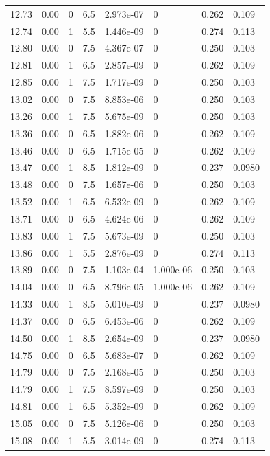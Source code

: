\documentclass[preview]{standalone}
\begin{document}
{{{{\begin{tabular}{L{1.2cm}C{1.2cm} C{0.3cm}C{0.5cm} C{1.4cm}C{1.4cm} C{1.4cm}C{1.4cm}}
  12.73  &  0.00  & 0     & 6.5 &  2.973e-07  & 0  & 0.262 &  0.109   \\ 
  12.74  &  0.00  & 1     & 5.5 &  1.446e-09  & 0  & 0.274 &  0.113   \\ 
  12.80  &  0.00  & 0     & 7.5 &  4.367e-07  & 0  & 0.250 &  0.103   \\ 
  12.81  &  0.00  & 1     & 6.5 &  2.857e-09  & 0  & 0.262 &  0.109   \\ 
  12.85  &  0.00  & 1     & 7.5 &  1.717e-09  & 0  & 0.250 &  0.103   \\ 
  13.02  &  0.00  & 0     & 7.5 &  8.853e-06  & 0  & 0.250 &  0.103   \\ 
  13.26  &  0.00  & 1     & 7.5 &  5.675e-09  & 0  & 0.250 &  0.103   \\ 
  13.36  &  0.00  & 0     & 6.5 &  1.882e-06  & 0  & 0.262 &  0.109   \\ 
  13.46  &  0.00  & 0     & 6.5 &  1.715e-05  & 0  & 0.262 &  0.109   \\ 
  13.47  &  0.00  & 1     & 8.5 &  1.812e-09  & 0  & 0.237 &  0.0980   \\ 
  13.48  &  0.00  & 0     & 7.5 &  1.657e-06  & 0  & 0.250 &  0.103   \\ 
  13.52  &  0.00  & 1     & 6.5 &  6.532e-09  & 0  & 0.262 &  0.109   \\ 
  13.71  &  0.00  & 0     & 6.5 &  4.624e-06  & 0  & 0.262 &  0.109   \\ 
  13.83  &  0.00  & 1     & 7.5 &  5.673e-09  & 0  & 0.250 &  0.103   \\ 
  13.86  &  0.00  & 1     & 5.5 &  2.876e-09  & 0  & 0.274 &  0.113   \\ 
  13.89  &  0.00  & 0     & 7.5 &  1.103e-04  & 1.000e-06  & 0.250 &  0.103   \\ 
  14.04  &  0.00  & 0     & 6.5 &  8.796e-05  & 1.000e-06  & 0.262 &  0.109   \\ 
  14.33  &  0.00  & 1     & 8.5 &  5.010e-09  & 0  & 0.237 &  0.0980   \\ 
  14.37  &  0.00  & 0     & 6.5 &  6.453e-06  & 0  & 0.262 &  0.109   \\ 
  14.50  &  0.00  & 1     & 8.5 &  2.654e-09  & 0  & 0.237 &  0.0980   \\ 
  14.75  &  0.00  & 0     & 6.5 &  5.683e-07  & 0  & 0.262 &  0.109   \\ 
  14.79  &  0.00  & 0     & 7.5 &  2.168e-05  & 0  & 0.250 &  0.103   \\ 
  14.79  &  0.00  & 1     & 7.5 &  8.597e-09  & 0  & 0.250 &  0.103   \\ 
  14.81  &  0.00  & 1     & 6.5 &  5.352e-09  & 0  & 0.262 &  0.109   \\ 
  15.05  &  0.00  & 0     & 7.5 &  5.126e-06  & 0  & 0.250 &  0.103   \\ 
  15.08  &  0.00  & 1     & 5.5 &  3.014e-09  & 0  & 0.274 &  0.113   \\ 
\hline 
\end{tabular} 

}}}}
\end{document}
